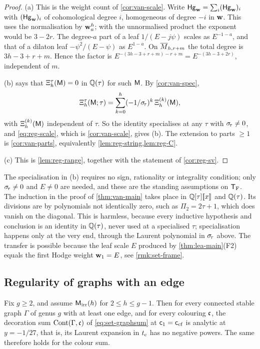 \begin{proof}
(a) This is the weight count of \cref{cor:van-scale}. Write $\mathsf{Hg}_{\mathbf{w}}=\sum_i(\mathsf{Hg}_{\mathbf{w}})_i$ with $(\mathsf{Hg}_{\mathbf{w}})_i$ of cohomological degree $i$, homogeneous of degree $-i$ in $\mathbf{w}$. This uses the normalisation by $\mathbf{w}_a^{h}$; with the unnormalised product the exponent would be $3-2r$. The degree-$a$ part of a leaf $1/(E-j\psi)$ scales as $E^{-1-a}$, and that of a dilaton leaf $-\psi^2/(E-\psi)$ as $E^{1-a}$. On $\overline{M}_{h,r+m}$ the total degree is $3h-3+r+m$. Hence the factor is $E^{-(3h-3+r+m)-r+m}=E^{-(3h-3+2r)}$, independent of $m$.

(b)  says that $\Xi^{\tau}_h(\mathsf{M})=0$ in $\mathbb{Q}(\tau)$ for such $\mathsf{M}$. By \cref{cor:van-spec},
\[
\Xi^{\tau}_h(\mathsf{M};\tau)=\sum_{k=0}^{h}(-1/\sigma_{\!\tau})^k\,\Xi^{(k)}_h(\mathsf{M}),
\]
with $\Xi^{(k)}_h(\mathsf{M})$ independent of $\tau$. So the identity specialises at any $\tau$ with $\sigma_{\!\tau}\neq 0$, and \cref{eq:reg-scale}, which is \cref{cor:van-scale}, gives (b). The extension to parts $\geq 1$ is \cref{cor:van-parts}, equivalently \cref{lem:reg-string,lem:reg-C}.

(c) This is \cref{lem:reg-range}, together with the statement of \cref{cor:reg-sv}.
\end{proof}

The specialisation in (b) requires no sign, rationality or integrality condition; only $\sigma_{\!\tau}\neq 0$ and $E\neq 0$ are needed, and these are the standing assumptions on $\mathsf{T}_{\mathrm{F}}$. The induction in the proof of \cref{thm:van-main} takes place in $\mathbb{Q}[\tau][\![ x ]\!]$ and $\mathbb{Q}(\tau)$. Its divisions are by polynomials not identically zero, such as $\Pi_2=2\tau+1$, which does vanish on the diagonal. This is harmless, because every inductive hypothesis and conclusion is an identity in $\mathbb{Q}(\tau)$, never used at a specialised $\tau$; specialisation happens only at the very end, through the Laurent polynomial in $\sigma_{\!\tau}$ above. The transfer is possible because the leaf scale $E$ produced by \cref{thm:lea-main}(F2) equals the first Hodge weight $\mathbf{w}_1=E$, see \cref{rmk:set-frame}.

\subsection{Regularity of graphs with an edge}

\begin{thm}
\label{thm:reg-main}
Fix $g\geq 2$, and assume $\mathsf{M}_{\mathrm{irr}}(h)$ for $2\leq h\leq g-1$. Then for every connected stable graph $\Gamma$ of genus $g$ with at least one edge, and for every colouring $\mathfrak{c}$, the decoration sum $\mathrm{Cont}(\Gamma,\mathfrak{c})$ of \cref{eq:set-graphsum} at $\mathsf{c}_{1}=\mathsf{c}_{\mathrm{cf}}$ is analytic at $y=-1/27$, that is, its Laurent expansion in $t_{\mathrm{c}}$ has no negative powers. The same therefore holds for the colour sum.
\end{thm}

